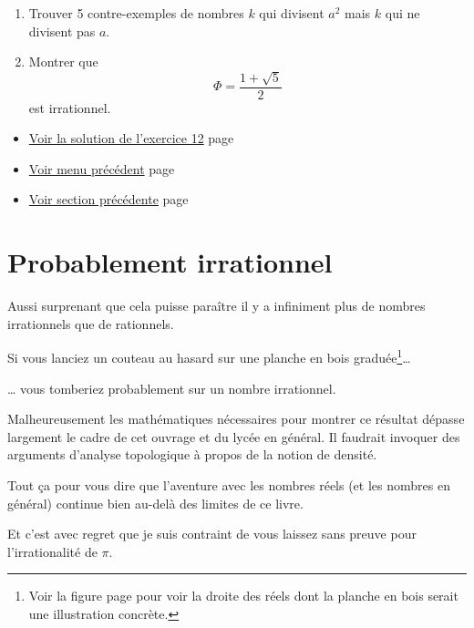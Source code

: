 \documentclass[a4paper,11pt]{book}
\begin{document}
\begin{enumerate}
\item Trouver 5 contre-exemples de nombres \(k\) qui divisent \(a^2\) mais
\(k\) qui ne divisent pas \(a\).
\item Montrer que \[\Phi = \dfrac{1 + \sqrt{5}}{2}\] est
irrationnel.
\end{enumerate}



\begin{itemize}
\item \hyperref[org86d02ad]{Voir la solution de l'exercice 12}
page~\pageref{page:sec8.6.2sol11}
\item \hyperref[orgc112f4f]{Voir menu précédent}
page~\pageref{page:content6-menu}
\item \hyperref[org24a50ec]{Voir section précédente}
page~\pageref{page:sec2.6.6gen}
\end{itemize}


\clearpage

\section{Probablement irrationnel}
\label{sec:orga8d0f3b}
\label{org01d7b7d}
\label{page:sec2.6.8prob}


Aussi surprenant que cela puisse paraître il y a infiniment plus
de nombres irrationnels que
de rationnels.

Si vous lanciez un couteau au hasard sur une planche en bois
graduée\footnote{Voir la figure page \pageref{page:real-line} pour voir
la droite des réels dont la planche en bois serait une illustration
concrète.}\ldots{}

\ldots{} vous tomberiez probablement sur un nombre irrationnel.

Malheureusement les mathématiques nécessaires pour
montrer ce résultat dépasse largement le cadre de cet
ouvrage et du lycée en général. Il faudrait invoquer des arguments
d'analyse topologique à propos de la notion de densité.

Tout ça pour vous dire que l'aventure avec les nombres
réels (et les nombres en général) continue bien
au-delà des limites de ce livre.

Et c'est avec regret que je suis contraint de vous laissez sans preuve
pour l'irrationalité de
\(\pi\).
\end{document}

